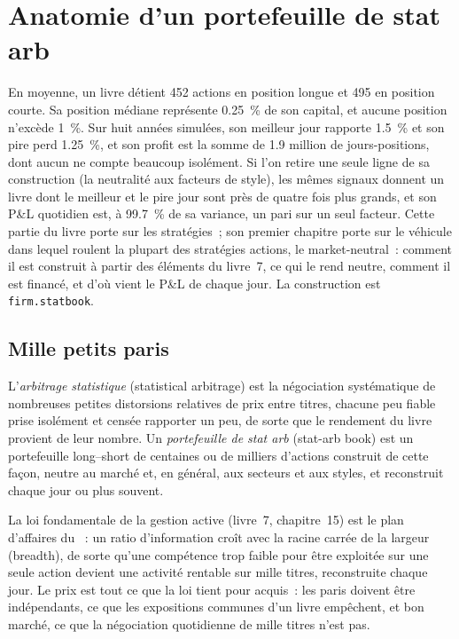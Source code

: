 \chapter{Anatomie d'un portefeuille de stat arb}\label{ch:s1:anatomy-of-a-stat-arb-book}

En moyenne, un livre détient 452 actions en position longue et 495 en position courte. Sa position médiane représente 0.25~\% de son capital, et aucune position n'excède 1~\%.
Sur huit années simulées, son meilleur jour rapporte 1.5~\% et son pire perd 1.25~\%, et son profit est la somme de 1.9 million de jours-positions, dont aucun
ne compte beaucoup isolément. Si l'on retire une seule ligne de sa construction (la neutralité aux facteurs de style), les mêmes signaux donnent un livre dont le meilleur et le pire jour sont
près de quatre fois plus grands, et son P\&L quotidien est, à 99.7~\% de sa variance, un pari sur un seul facteur. Cette partie du livre porte sur les stratégies~; son
premier chapitre porte sur le véhicule dans lequel roulent la plupart des stratégies actions, le  market-neutral~: comment il est construit à partir des éléments du livre~7, ce qui le rend
neutre, comment il est financé, et d'où vient le P\&L de chaque jour. La construction est \texttt{firm.statbook}.

\section{Mille petits paris}

\begin{definition}\label{def:s1:anatomy-of-a-stat-arb-book:statarb}
L'\emph{arbitrage statistique} (statistical arbitrage) est la négociation systématique de nombreuses petites distorsions relatives de prix entre
titres, chacune peu fiable prise isolément et censée rapporter un peu, de sorte que le rendement du livre provient de leur nombre. Un \emph{portefeuille de stat arb} (stat-arb book) est un portefeuille long--short
de centaines ou de milliers d'actions construit de cette façon, neutre au marché et, en général, aux secteurs et aux styles, et reconstruit chaque jour ou plus souvent.
\end{definition}

La loi fondamentale de la gestion active (livre~7, chapitre~15) est le plan d'affaires du ~: un ratio d'information croît avec la racine carrée de la
largeur (breadth), de sorte qu'une compétence trop faible pour être exploitée sur une seule action devient une activité rentable sur mille titres, reconstruite chaque jour. Le prix est tout ce que la loi tient pour acquis~:
les paris doivent être indépendants, ce que les expositions communes d'un livre empêchent, et bon marché, ce que la négociation quotidienne de mille titres n'est pas.


